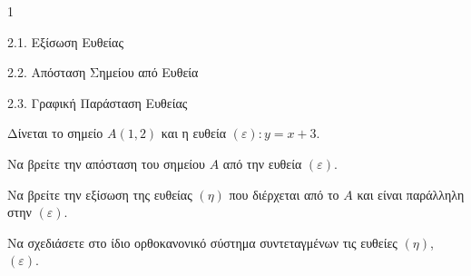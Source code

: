 \begin{ylh}{1}
    \item 2.1. Εξίσωση Ευθείας
    \item 2.2. Απόσταση Σημείου από Ευθεία
    \item 2.3. Γραφική Παράσταση Ευθείας
\end{ylh}
Δίνεται το σημείο $A(1,2)$ και η ευθεία $(\varepsilon): y = x+3$.
\begin{alist}
\item Να βρείτε την απόσταση του σημείου $A$ από την ευθεία $(\varepsilon)$. 
\item Να βρείτε την εξίσωση της ευθείας $(\eta)$ που διέρχεται από το $A$ και είναι παράλληλη στην $(\varepsilon)$. 
\item Να σχεδιάσετε στο ίδιο ορθοκανονικό σύστημα συντεταγμένων τις ευθείες $(\eta)$, $(\varepsilon)$. 
\end{alist}